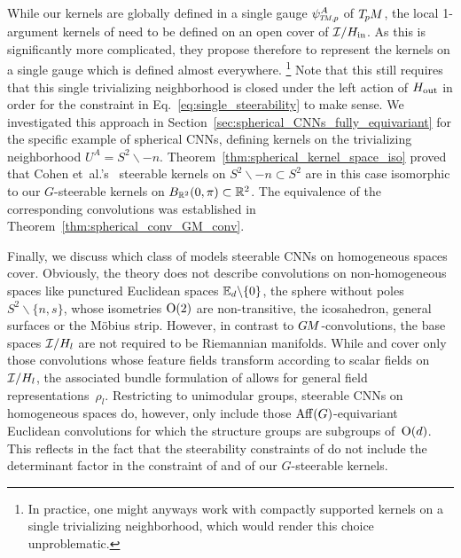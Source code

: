 While our kernels are globally defined in a single gauge $\psiTMp^A$ of $T_{\mkern-1.5mu p}\mkern-.5muM$, the local 1-argument kernels of \citet{Cohen2018-intertwiners}\cite{Cohen2019-generaltheory} need to be defined on an open cover of $\mathcal{I}/H_{\textup{in}}$.
As this is significantly more complicated, they propose therefore to represent the kernels on a single gauge which is defined almost everywhere.%
\footnote{
    In practice, one might anyways work with compactly supported kernels on a single trivializing neighborhood, which would render this choice unproblematic.
}
Note that this still requires that this single trivializing neighborhood is closed under the left action of $H_{\textup{out}}$ in order for the constraint in Eq.~\eqref{eq:single_steerability} to make sense.
We investigated this approach in Section~\ref{sec:spherical_CNNs_fully_equivariant} for the specific example of spherical CNNs, defining kernels on the trivializing neighborhood $U^A = S^2\backslash -n$.
Theorem~\ref{thm:spherical_kernel_space_iso} proved that Cohen \mbox{et al.'s}~\cite{Cohen2018-intertwiners}\cite{Cohen2019-generaltheory} steerable kernels on $S^2\backslash -n \subset S^2$ are in this case isomorphic to our $G$-steerable kernels on $B_{\mathbb{R}^2}(0,\pi) \subset \mathbb{R}^2$.
The equivalence of the corresponding convolutions was established in Theorem~\ref{thm:spherical_conv_GM_conv}.



Finally, we discuss which class of models steerable CNNs on homogeneous spaces cover.
Obviously, the theory does not describe convolutions on non-homogeneous spaces like punctured Euclidean spaces $\mathbb{E}_d\backslash\{0\}$, the sphere without poles $S^2 \backslash \{n,s\}$, whose isometries $\operatorname{O}(2)$ are non-transitive, the icosahedron, general surfaces or the M\"obius strip.
However, in contrast to $G\mkern-1.4muM$-convolutions, the base spaces $\mathcal{I}/H_l$ are not required to be Riemannian manifolds.
While \citet{Kondor2018-GENERAL} and \citet{bekkers2020bspline} cover only those convolutions whose feature fields transform according to scalar fields on $\mathcal{I}/H_l$, the associated bundle formulation of \citet{Cohen2018-intertwiners}\cite{Cohen2019-generaltheory} allows for general field representations~$\rho_l$.
Restricting to unimodular groups, steerable CNNs on homogeneous spaces do, however, only include those $\operatorname{Aff}(G)$-equivariant Euclidean convolutions for which the structure groups are subgroups of~$\operatorname{O}(d)$.
This reflects in the fact that the steerability constraints of \citet{Cohen2018-intertwiners}\cite{Cohen2019-generaltheory} do not include the determinant factor in the constraint of \citet{bekkers2020bspline} and of our $G$-steerable kernels.
